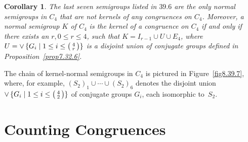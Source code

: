 \documentclass{surv-l}
\numberwithin{equation}{section}
\numberwithin{table}{section}
\numberwithin{figure}{section}
\theoremstyle{plain}
\newtheorem{corollary}[equation]{Corollary}
\theoremstyle{definition}
\begin{document}
\setcounter{equation}{7}
\begin{corollary}\label{cor8.39.8}
The last seven semigroups listed in $39.6$ are the only normal
semigroups in $C_{4}$ that
are not kernels of any congruences on $C_{4}$. Moreover, a normal
semigroup $K$ of $C_{4}$ is the kernel of a congruence on $C_{4}$
if and only if there exists an $r, 0\leq r\leq 4$, such that
$K=I_{r-1}\cup U\cup E_{4}$, where $U=\vee\,\{G_{i}\mid 1 \leq
i\leq\big(\kern0.5pt\begin{smallmatrix}
4\\
r \end{smallmatrix}\kern0.5pt\big)\}$ is a disjoint union of conjugate
groups defined in \emph{Proposition~\ref{prop7.32.6}}.
\end{corollary}

The chain of kernel-normal semigroups in $C_{4}$ is pictured in
Figure~\ref{fig8.39.7}, where, for example,
$(S_{2})_{1}\cup\cdots\cup(S_{2})_{6}$ denotes the disjoint union
$\vee\,\{G_{i}\mid 1\leq i\leq\big(\kern0.5pt\begin{smallmatrix}
4\\
2 \end{smallmatrix}\kern0.5pt\big)\}$ of conjugate groups $G_{i}$, each
isomorphic to~$S_{2}$.

\section{Counting Congruences}\label{sec8.40}
\end{document}
